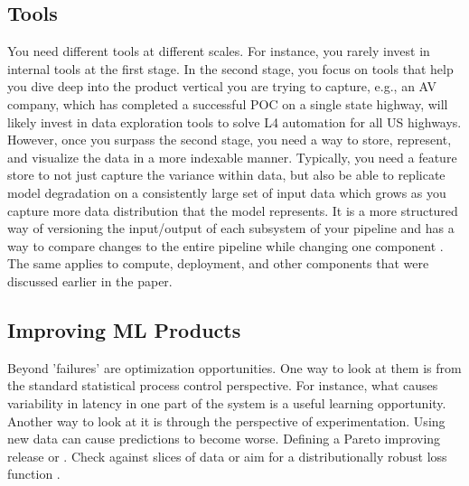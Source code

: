 \documentclass[12pt, letterpaper]{article}
\begin{document}
\subsection{Tools}

You need different tools at different scales. For instance, you rarely invest in internal tools at the first stage. In the second stage, you focus on tools that help you dive deep into the product vertical you are trying to capture, e.g., an AV company, which has completed a successful POC on a single state highway, will likely invest in data exploration tools to solve L4 automation for all US highways. However, once you surpass the second stage, you need a way to store, represent, and visualize the data in a more indexable manner. Typically, you need a feature store to not just capture the variance within data, but also be able to replicate model degradation on a consistently large set of input data which grows as you capture more data distribution that the model represents. It is a more structured way of versioning the input/output of each subsystem of your pipeline and has a way to compare changes to the entire pipeline while changing one component \citep{sculley2015hidden}. The same applies to compute, deployment, and other components that were discussed earlier in the paper. 

\subsection{Improving ML Products}
Beyond 'failures' are optimization opportunities. One way to look at them is from the standard statistical process control perspective. For instance, what causes variability in latency in one part of the system is a useful learning opportunity. Another way to look at it is through the perspective of experimentation. 
Using new data can cause predictions to become worse. Defining a Pareto improving release or .  Check against slices of data or aim for a distributionally robust loss function \citep{duchi2023distributionally}.


\newpage


\end{document}
